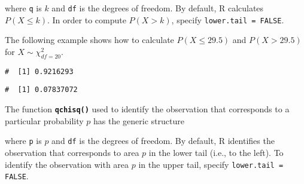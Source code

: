 \documentclass[letterpaper,12pt,twoside,]{pinp}
\begin{document}
where \texttt{q} is \(k\) and \texttt{df} is the degrees of freedom. By
default, \textsf{R} calculates \(P(X \leq k)\). In order to compute
\(P(X > k)\), specify \texttt{lower.tail = FALSE}.

The following example shows how to calculate \(P(X \leq 29.5)\) and
\(P(X > 29.5)\) for \(X \sim \chi^2_{df = 20}\).

\begin{Shaded}
\begin{Highlighting}[]
\NormalTok{(}\NormalTok{, } \NormalTok{)}
\end{Highlighting}
\end{Shaded}

\begin{ShadedResult}
\begin{verbatim}
#  [1] 0.9216293
\end{verbatim}
\end{ShadedResult}

\begin{Shaded}
\begin{Highlighting}[]
\NormalTok{(}\NormalTok{, } \NormalTok{, } \NormalTok{)}
\end{Highlighting}
\end{Shaded}

\begin{ShadedResult}
\begin{verbatim}
#  [1] 0.07837072
\end{verbatim}
\end{ShadedResult}

\vspace{0.5cm}

The function \textbf{\texttt{qchisq()}} used to identify the observation
that corresponds to a particular probability \(p\) has the generic
structure

\begin{Shaded}
\begin{Highlighting}[]
 \NormalTok{)}
\end{Highlighting}
\end{Shaded}

where \texttt{p} is \(p\) and \texttt{df} is the degrees of freedom. By
default, \textsf{R} identifies the observation that corresponds to area
\(p\) in the lower tail (i.e., to the left). To identify the observation
with area \(p\) in the upper tail, specify \texttt{lower.tail = FALSE}.
\end{document}
